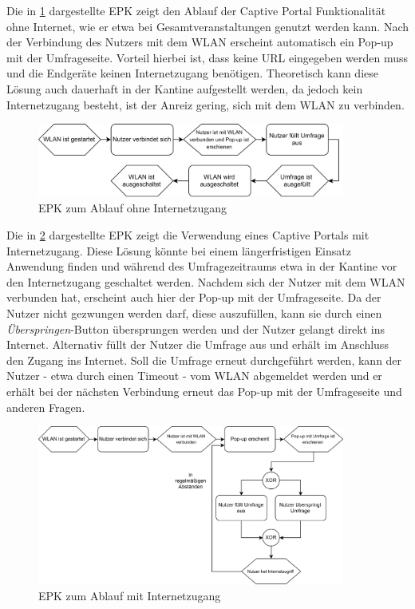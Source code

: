 Die in \ref{fig:captive_epk1} dargestellte EPK zeigt den Ablauf der Captive Portal Funktionalität ohne Internet, wie er etwa bei Gesamtveranstaltungen genutzt werden kann. Nach der Verbindung des Nutzers mit dem WLAN erscheint automatisch ein Pop-up mit der Umfrageseite. Vorteil hierbei ist, dass keine URL eingegeben werden muss und die Endgeräte keinen Internetzugang benötigen. Theoretisch kann diese Lösung auch dauerhaft in der Kantine aufgestellt werden, da jedoch kein Internetzugang besteht, ist der Anreiz gering, sich mit dem WLAN zu verbinden.
\newline
\begin{figure}[H]
\centering
\includegraphics[width=0.9\textwidth]{images/captiveportal_EPK1}
\caption[EPK zum Ablauf ohne Internetzugang]{EPK zum Ablauf ohne Internetzugang}
\label{fig:captive_epk1}
\end{figure}


Die in \ref{fig:captive_epk2} dargestellte EPK zeigt die Verwendung eines Captive Portals mit Internetzugang. Diese Lösung könnte bei einem längerfristigen Einsatz Anwendung finden und während des Umfragezeitraums etwa in der Kantine vor den Internetzugang geschaltet werden. Nachdem sich der Nutzer mit dem WLAN verbunden hat, erscheint auch hier der Pop-up mit der Umfrageseite. Da der Nutzer nicht gezwungen werden darf, diese auszufüllen, kann sie durch einen \textit{Überspringen}-Button übersprungen werden und der Nutzer gelangt direkt ins Internet. Alternativ füllt der Nutzer die Umfrage aus und erhält im Anschluss den Zugang ins Internet. Soll die Umfrage erneut durchgeführt werden, kann der Nutzer - etwa durch einen Timeout - vom WLAN abgemeldet werden und er erhält bei der nächsten Verbindung erneut das Pop-up mit der Umfrageseite und anderen Fragen.

\begin{figure}[H]
\centering
\includegraphics[width=0.9\textwidth]{images/captiveportal_EPK2}
\caption[EPK zum Ablauf mit Internetzugang]{EPK zum Ablauf mit Internetzugang}
\label{fig:captive_epk2}
\end{figure}

